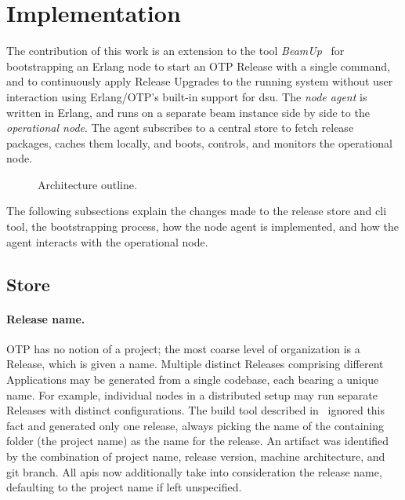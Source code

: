 \section{Implementation}

The contribution of this work is an extension to the tool \emph{BeamUp}~\cite{zak18} for bootstrapping an Erlang node to start an OTP Release with a single command, and to continuously apply Release Upgrades to the running system without user interaction using Erlang/OTP's built-in support for \acrshort{dsu}. The \emph{node agent} is written in Erlang, and runs on a separate \acrshort{beam} instance side by side to the \emph{operational node}. The agent subscribes to a central store to fetch release packages, caches them locally, and boots, controls, and monitors the operational node.


\begin{figure}[h]
  \centering
  \caption{Architecture outline.}\label{fig:impl}
\end{figure}

The following subsections explain the changes made to the release store and \acrshort{cli} tool, the bootstrapping process, how the node agent is implemented, and how the agent interacts with the operational node.

\subsection{Store}


\paragraph{Release name.}
OTP has no notion of a project; the most coarse level of organization is a Release, which is given a name. Multiple distinct Releases comprising different Applications may be generated from a single codebase, each bearing a unique name. For example, individual nodes in a distributed setup may run separate Releases with distinct configurations. The build tool described in~\cite{zak18} ignored this fact and generated only one release, always picking the name of the containing folder (the project name) as the name for the release. An artifact was identified by the combination of project name, release version, machine architecture, and git branch. All \acrshort{api}s now additionally take into consideration the release name, defaulting to the project name if left unspecified.

